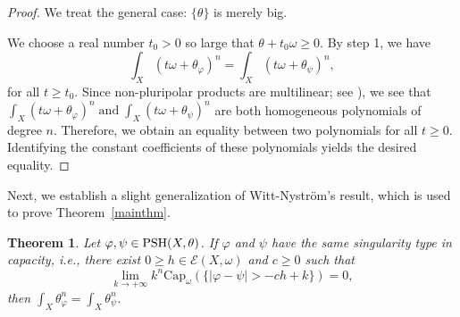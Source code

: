 \documentclass[a4paper]{amsart}
\numberwithin{equation}{section}
\newtheorem{theorem}{Theorem}[section]
\theoremstyle{definition}
\numberwithin{equation}{section}
\newcommand{\capK}{\text{Cap}}
\newcommand{\PSH}{{\rm PSH}}
\begin{document}
\begin{proof}
\smallskip
{} We treat the general case: $\{\theta \} $ is merely big.


We choose a real number $t_0>0$ so large that $\theta + t_0 \omega \geq 0$. By step 1, we have
$$\int_{ X }  (t\omega + \theta_{ \varphi } )^n  = \int_{ X } (t\omega + \theta_{ \psi } )^n ,$$
for all $t\geq t_0$. 
Since non-pluripolar products are multilinear; see \cite[Proposition 1.4]{boucksom2010monge}), we see that $\int_{ X }  (t\omega + \theta_{ \varphi } )^n  \;\text{and}\; \int_{X}  (t\omega + \theta_{ \psi } )^n $ are both homogeneous polynomials of degree $n$. Therefore, we obtain an equality between two polynomials for all $t\geq 0$. Identifying the constant coefficients of these polynomials yields the desired equality.
 \end{proof}
 Next, we establish a slight generalization of Witt-Nystr\"om's result, which is used to prove Theorem~\ref{mainthm}.
\begin{theorem}\label{thm: sub-main} Let $\varphi,\psi\in\PSH(X,\theta)$. If $\varphi$ and $\psi$ have the same singularity type in capacity, i.e.,
    there exist $0\geq h\in\mathcal{E}(X,\omega)$ and $c\geq 0$ such that 
	\[\lim_{k\to+\infty}k^n\capK_{\omega}(\{|\varphi-\psi|>-ch+k\})=0,  \]
	then $\int_X\theta_\varphi^n=\int_X\theta_\psi^n$.
\end{theorem}
\end{document}
